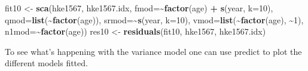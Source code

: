 \documentclass[
]{book}
\newenvironment{Shaded}{\begin{snugshade}}{\end{snugshade}}
\newcommand{\AttributeTok}[1]{\textcolor[rgb]{0.13,0.29,0.53}{#1}}
\newcommand{\DecValTok}[1]{\textcolor[rgb]{0.00,0.00,0.81}{#1}}
\newcommand{\FunctionTok}[1]{\textcolor[rgb]{0.13,0.29,0.53}{\textbf{#1}}}
\newcommand{\NormalTok}[1]{#1}
\newcommand{\OtherTok}[1]{\textcolor[rgb]{0.56,0.35,0.01}{#1}}
\newcommand{\SpecialCharTok}[1]{\textcolor[rgb]{0.81,0.36,0.00}{\textbf{#1}}}
\newcommand{\StringTok}[1]{\textcolor[rgb]{0.31,0.60,0.02}{#1}}
\begin{document}
\begin{Shaded}
\begin{Highlighting}[]
\NormalTok{fit10 }\OtherTok{\textless{}{-}} \FunctionTok{sca}\NormalTok{(hke1567, hke1567.idx, }\AttributeTok{fmod=}\SpecialCharTok{\textasciitilde{}}\FunctionTok{factor}\NormalTok{(age) }\SpecialCharTok{+} \FunctionTok{s}\NormalTok{(year, }\AttributeTok{k=}\DecValTok{10}\NormalTok{), }\AttributeTok{qmod=}\FunctionTok{list}\NormalTok{(}\SpecialCharTok{\textasciitilde{}}\FunctionTok{factor}\NormalTok{(age)), }\AttributeTok{srmod=}\SpecialCharTok{\textasciitilde{}}\FunctionTok{s}\NormalTok{(year, }\AttributeTok{k=}\DecValTok{10}\NormalTok{), }\AttributeTok{vmod=}\FunctionTok{list}\NormalTok{(}\SpecialCharTok{\textasciitilde{}}\FunctionTok{factor}\NormalTok{(age), }\SpecialCharTok{\textasciitilde{}}\DecValTok{1}\NormalTok{),  }\AttributeTok{n1mod=}\SpecialCharTok{\textasciitilde{}}\FunctionTok{factor}\NormalTok{(age))}
\NormalTok{res10 }\OtherTok{\textless{}{-}} \FunctionTok{residuals}\NormalTok{(fit10, hke1567, hke1567.idx)}
\end{Highlighting}
\end{Shaded}

To see what's happening with the variance model one can use predict to plot the different models fitted.

\begin{Shaded}
\end{Shaded}
\end{document}
